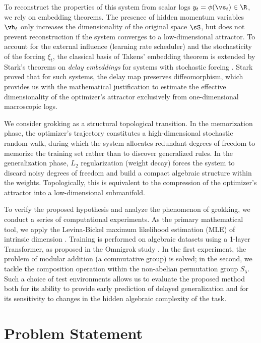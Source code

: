 \documentclass{article}
\begin{document}
To reconstruct the properties of this system from scalar logs $y_t = \phi(\vs_t) \in \R$, we rely on embedding theorems. The presence of hidden momentum variables $\vh_t$ only increases the dimensionality of the original space $\sS$, but does not prevent reconstruction if the system converges to a low-dimensional attractor. To account for the external influence (learning rate scheduler) and the stochasticity of the forcing $\xi_t$, the classical basis of Takens' embedding theorem \citep{takens1981detecting} is extended by Stark's theorems on \textit{delay embeddings} for systems with stochastic forcing \citep{stark1999delay, stark2003delay}. Stark proved that for such systems, the delay map preserves diffeomorphism, which provides us with the mathematical justification to estimate the effective dimensionality of the optimizer's attractor exclusively from one-dimensional macroscopic logs.

We consider grokking as a structural topological transition. In the memorization phase, the optimizer's trajectory constitutes a high-dimensional stochastic random walk, during which the system allocates redundant degrees of freedom to memorize the training set rather than to discover generalized rules. In the generalization phase, $L_2$ regularization (weight decay) forces the system to discard noisy degrees of freedom and build a compact algebraic structure within the weights. Topologically, this is equivalent to the compression of the optimizer's attractor into a low-dimensional submanifold.

To verify the proposed hypothesis and analyze the phenomenon of grokking, we conduct a series of computational experiments. As the primary mathematical tool, we apply the Levina-Bickel maximum likelihood estimation (MLE) of intrinsic dimension \citep{levina2004maximum}. Training is performed on algebraic datasets using a 1-layer Transformer, as proposed in the Omnigrok study \citep{liu2022omnigrok}. In the first experiment, the problem of modular addition (a commutative group) is solved; in the second, we tackle the composition operation within the non-abelian permutation group $S_5$. Such a choice of test environments allows us to evaluate the proposed method both for its ability to provide early prediction of delayed generalization and for its sensitivity to changes in the hidden algebraic complexity of the task.






\section{Problem Statement}\label{sec:problem}
\end{document}
